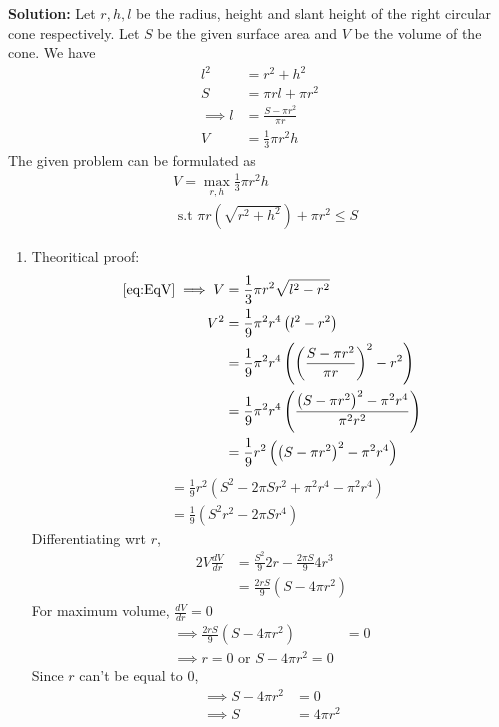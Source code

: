 \documentclass[12pt]{article}
\providecommand{\brak}[1]{\ensuremath{\left(#1\right)}}
\newcommand{\solution}{\noindent \textbf{Solution: }}
\begin{document}
\begin{enumerate}
\solution 
Let $r,h,l$ be the radius, height and slant height of the right circular cone respectively. Let $S$ be the given surface area and $V$ be the volume of the cone. We have 
\begin{align}
	l^2 &= r^2 + h^2 \\
	S &= \pi rl + \pi r^2 \\
	\implies l &= \frac{S-\pi r^2}{\pi r}\\
	\label{eq:EqV}
	V &= \frac{1}{3}\pi r^2h 
\end{align}
The given problem can be formulated as 
\begin{align}
	\label{eq:EqMax}
	& V = \max_{r,h} \frac{1}{3}\pi r^2h \\
	\label{eq:EqConstr}
	&\text { s.t } \pi r\brak{\sqrt{r^2+h^2}} + \pi r^2 \leq S 
\end{align}
\begin{enumerate}
\item Theoritical proof:
\begin{align}
	\eqref{eq:EqV} \implies V &= \frac{1}{3}\pi r^2\sqrt{l^2-r^2} \\
	V^2 &= \frac{1}{9}\pi^2 r^4\brak{l^2-r^2} \\
	&= \frac{1}{9}\pi^2 r^4\brak{\brak{\frac{S-\pi r^2}{\pi r}}^2-r^2} \\
	&= \frac{1}{9}\pi^2 r^4\brak{\frac{\brak{S-\pi r^2}^2-\pi^2r^4 }{\pi^2 r^2}} \\
	&= \frac{1}{9} r^2\brak{\brak{S-\pi r^2}^2-\pi^2r^4 }
\end{align}
\begin{align}
	&= \frac{1}{9} r^2\brak{S^2- 2\pi S r^2 + \pi^2r^4 -\pi^2r^4 } \\
	&= \frac{1}{9} \brak{S^2r^2- 2\pi S r^4 } 
\end{align}
Differentiating wrt $r$,
\begin{align}
	\label{eq:EqDer}
	2V \frac{dV}{dr} &= \frac{S^2}{9}2r - \frac{2\pi S}{9}4r^3 \\ 
	&= \frac{2rS}{9}\brak{ S- 4\pi r^2} 
\end{align}
For maximum volume, $\frac{dV}{dr} = 0$
\begin{align}
 	\implies  \frac{2rS}{9}\brak{ S- 4\pi r^2} &= 0 \\ 
	\implies r = 0 \text{ or } S - 4\pi r^2 = 0 
\end{align}
Since $r$ can't be equal to 0,
\begin{align}
	\implies S - 4\pi r^2 &= 0 \\
	\label{eq:EqS}
	\implies S &= 4\pi r^2 \\

\end{align}
\end{enumerate}
\end{enumerate}
\end{document}
